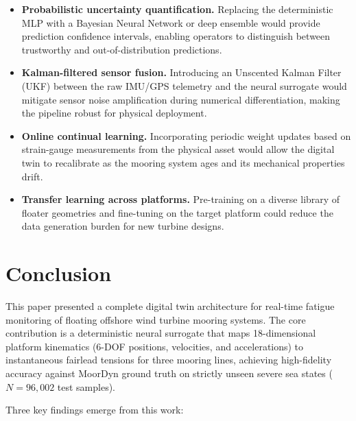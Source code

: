 \documentclass[preprint,12pt]{elsarticle}
\begin{document}
\begin{itemize}
    \item \textbf{Probabilistic uncertainty quantification.} Replacing the deterministic MLP with a Bayesian Neural Network or deep ensemble would provide prediction confidence intervals, enabling operators to distinguish between trustworthy and out-of-distribution predictions.
    \item \textbf{Kalman-filtered sensor fusion.} Introducing an Unscented Kalman Filter (UKF) between the raw IMU/GPS telemetry and the neural surrogate would mitigate sensor noise amplification during numerical differentiation, making the pipeline robust for physical deployment.
    \item \textbf{Online continual learning.} Incorporating periodic weight updates based on strain-gauge measurements from the physical asset would allow the digital twin to recalibrate as the mooring system ages and its mechanical properties drift.
    \item \textbf{Transfer learning across platforms.} Pre-training on a diverse library of floater geometries and fine-tuning on the target platform could reduce the data generation burden for new turbine designs.
\end{itemize}

\section{Conclusion}
\label{sec:conclusion}

This paper presented a complete digital twin architecture for real-time fatigue monitoring of floating offshore wind turbine mooring systems. The core contribution is a deterministic neural surrogate that maps 18-dimensional platform kinematics (6-DOF positions, velocities, and accelerations) to instantaneous fairlead tensions for three mooring lines, achieving high-fidelity accuracy against MoorDyn ground truth on strictly unseen severe sea states ($N = 96,002$ test samples).

Three key findings emerge from this work:
\end{document}
